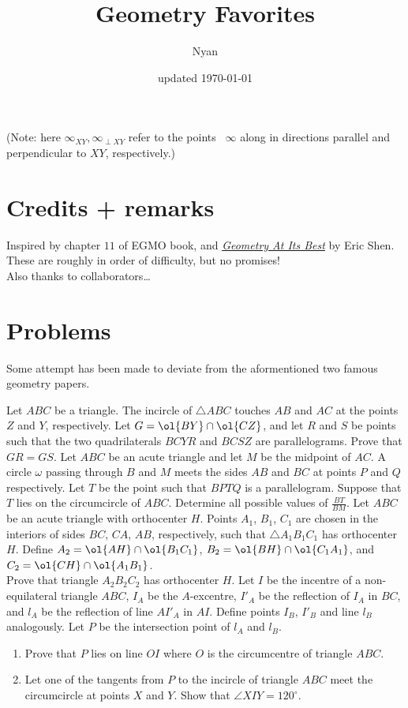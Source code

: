 \documentclass{seto}
\title{Geometry Favorites}
\date{updated \today}
\author{Nyan}
\begin{document}
\maketitle
(Note: here $\infty_{XY},\infty_{\perp XY}$ refer to the points \@\ $\infty$ along in directions parallel and perpendicular to $XY$, respectively.)
\setcounter{section}{-2}
\section{Credits + remarks}
Inspired by chapter $11$ of EGMO book, and \href{http://ericshen.net/handouts/GeometryAtItsBest.pdf}{\emph{Geometry At Its Best}} by Eric Shen.
These are roughly in order of difficulty, but no promises!\\
Also thanks to collaborators\dots
\toc
\section{Problems}
\begin{remark}
Some attempt has been made to deviate from the aformentioned two famous geometry papers.
\end{remark}
\exercise[SL 2009/G3]Let $ABC$ be a triangle. The incircle of $\triangle ABC$
touches $AB$ and $AC$ at the points $Z$ and $Y$, respectively. Let
$G=\ol{BY}\cap\ol{CZ}$, and let $R$ and $S$ be points such that the two
quadrilaterals $BCYR$ and $BCSZ$ are parallelograms. Prove that $GR=GS$.
\exercise[SL 2015/G4]Let $ABC$ be an acute triangle and let $M$ be the midpoint
of $AC$. A circle $\omega$ passing through $B$ and $M$ meets the sides $AB$ and
$BC$ at points $P$ and $Q$ respectively. Let $T$ be the point such that $BPTQ$
is a parallelogram. Suppose that $T$ lies on the circumcircle of $ABC$.
Determine all possible values of $\frac{BT}{BM}$. 
\exercise[USEMO 2023/4] Let $ABC$ be an acute triangle with orthocenter $H$. Points $A_1$, $B_1$, $C_1$ are
chosen in the interiors of sides $BC$, $CA$, $AB$, respectively, such that
$\triangle A_1B_1C_1$ has orthocenter $H$. Define $A_2 = \ol{AH} \cap
\ol{B_1C_1}$, $B_2 = \ol{BH} \cap \ol{C_1A_1}$, and $C_2 =
\ol{CH} \cap \ol{A_1B_1}$.\\[4pt]
Prove that triangle $A_2B_2C_2$ has orthocenter $H$.
\exercise[SL 2016/G7]Let $I$ be the incentre of a non-equilateral triangle $ABC$, $I_A$ be the $A$-excentre,
$I'_A$ be the reflection of $I_A$ in $BC$, and $l_A$ be the reflection of line
$AI'_A$ in $AI$. Define points $I_B$, $I'_B$ and line $l_B$ analogously. Let $P$
be the intersection point of $l_A$ and $l_B$.
\begin{enumerate}[label=(\alph*)]
\item Prove that $P$ lies on line $OI$ where $O$ is the circumcentre of triangle $ABC$.
\item Let one of the tangents from $P$ to the incircle of triangle $ABC$ meet
the circumcircle at points $X$ and $Y$. Show that $\angle XIY = 120^{\circ}$.
\end{enumerate}\vspace{-7pt} 
\end{document}
